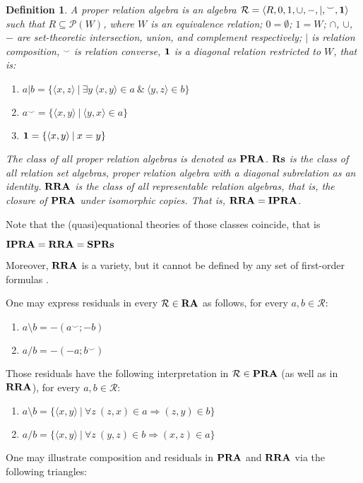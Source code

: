 \documentclass[a4paper]{article}
\theoremstyle{defin}
\newtheorem{defin}{Definition}
\theoremstyle{theorem}
\theoremstyle{prop}
\theoremstyle{lemma}
\theoremstyle{ex}
\theoremstyle{col}
\theoremstyle{claim}
\begin{document}
\begin{defin}
    A proper relation algebra is an algebra $\mathcal{R} = \langle R, 0, 1, \cup, -, |, {}^{\smile}, {\bf 1 }\rangle$ such that $R \subseteq \mathcal{P}(W)$, where $W$ is an equivalence relation; $0 = \emptyset$; $1 = W$; $\cap$, $\cup$, $-$ are set-theoretic intersection, union, and
    complement respectively; $|$ is relation composition, ${}^{\smile}$ is relation converse, ${\bf 1}$ is a
    diagonal relation restricted to $W$, that is:
    \begin{enumerate}
    \item $a | b = \{ \langle x, z \rangle \: | \: \exists y \: \langle x, y \rangle \in a \: \& \: \langle y, z \rangle \in b \}$
    \item $a^{\smile} = \{ \langle x, y \rangle \: | \: \langle y, x \rangle \in a \}$
    \item ${\bf 1} = \{ \langle x, y \rangle \: | \: x = y \}$
    \end{enumerate}
      The class of all proper relation algebras is denoted as ${\bf PRA}$. ${\bf Rs}$ is the class of all relation set algebras, proper relation algebra with a diagonal subrelation as an identity. ${\bf RRA}$ is the class of all representable relation algebras, that is, the closure of ${\bf PRA}$ under isomorphic copies. That is,
      ${\bf RRA} = {\bf IPRA}$.
\end{defin}
Note that the (quasi)equational theories of those classes coincide, that is
\begin{center}
  ${\bf IPRA} = {\bf RRA} = {\bf SP}{\bf Rs}$
\end{center}
Moreover, ${\bf RRA}$ is a variety, but it cannot be defined by any set of first-order formulas \cite{monk1964representable}.

One may express residuals in every $\mathcal{R} \in {\bf RA}$ as follows, for every $a, b \in \mathcal{R}$:

\begin{enumerate}
  \item $a \setminus b = -(a^{\smile} ; -b)$
  \item $a / b = - (- a ; b^{\smile})$
\end{enumerate}

Those residuals have the following interpretation in $\mathcal{R} \in {\bf PRA}$ (as well as in ${\bf RRA}$), for every $a, b \in \mathcal{R}$:
\begin{enumerate}
  \item $a \setminus b = \{ \langle x, y \rangle \: | \: \forall z \: (z, x) \in a \Rightarrow (z, y) \in b \}$
  \item $a / b = \{ \langle x, y \rangle \: | \: \forall z \: (y, z) \in b \Rightarrow (x, z) \in a \}$
\end{enumerate}
One may illustrate composition and residuals in ${\bf PRA}$ and ${\bf RRA}$ via the following triangles:
\end{document}
